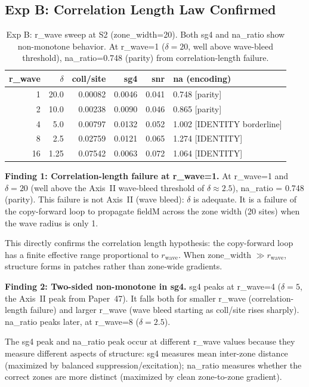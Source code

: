\documentclass[11pt,a4paper]{article}
\begin{document}
\subsection{Exp B: Correlation Length Law Confirmed}

\begin{table}[h!]
\centering
\small
\begin{tabular}{rrrrrl}
\toprule
r\_wave & $\delta$ & coll/site & sg4 & snr & na (encoding) \\
\midrule
1 & 20.0 & 0.00082 & 0.0046 & 0.041 & 0.748 [parity] \\
2 & 10.0 & 0.00238 & 0.0090 & 0.046 & 0.865 [parity] \\
4 & 5.0  & 0.00797 & 0.0132 & 0.052 & 1.002 [IDENTITY borderline] \\
8 & 2.5  & 0.02759 & 0.0121 & 0.065 & 1.274 [IDENTITY] \\
16 & 1.25 & 0.07542 & 0.0063 & 0.072 & 1.064 [IDENTITY] \\
\bottomrule
\end{tabular}
\caption{Exp B: r\_wave sweep at S2 (zone\_width=20). Both sg4 and na\_ratio
show non-monotone behavior. At r\_wave=1 ($\delta=20$, well above wave-bleed
threshold), na\_ratio=0.748 (parity) from correlation-length failure.}
\end{table}

\textbf{Finding 1: Correlation-length failure at r\_wave=1.}
At r\_wave=1 and $\delta=20$ (well above the Axis~II wave-bleed threshold of
$\delta \approx 2.5$), na\_ratio = 0.748 (parity).
This failure is not Axis~II (wave bleed): $\delta$ is adequate.
It is a failure of the copy-forward loop to propagate fieldM across the
zone width (20 sites) when the wave radius is only 1.

This directly confirms the correlation length hypothesis: the copy-forward loop
has a finite effective range proportional to $r_\text{wave}$.
When zone\_width $\gg r_\text{wave}$, structure forms in patches rather than
zone-wide gradients.

\textbf{Finding 2: Two-sided non-monotone in sg4.}
sg4 peaks at r\_wave=4 ($\delta=5$, the Axis~II peak from Paper~47).
It falls both for smaller r\_wave (correlation-length failure) and larger
r\_wave (wave bleed starting as coll/site rises sharply).
na\_ratio peaks later, at r\_wave=8 ($\delta=2.5$).

The sg4 peak and na\_ratio peak occur at different r\_wave values because they
measure different aspects of structure:
sg4 measures mean inter-zone distance (maximized by balanced suppression/excitation);
na\_ratio measures whether the correct zones are more distinct (maximized by
clean zone-to-zone gradient).
\end{document}
